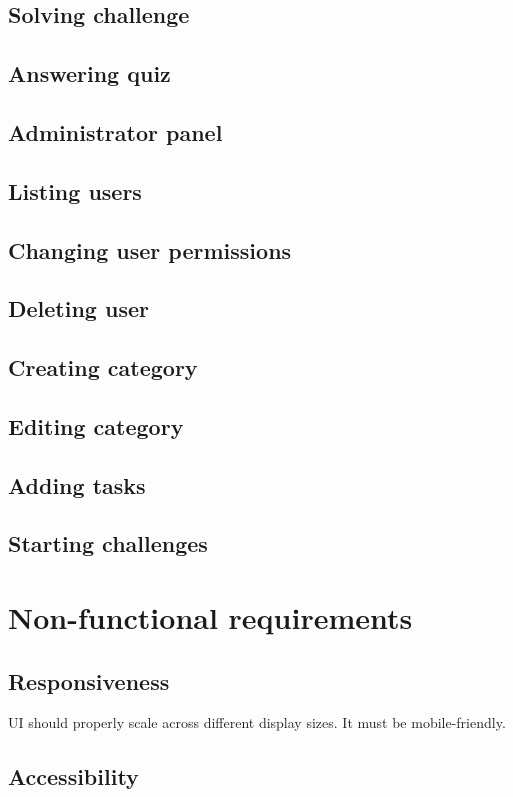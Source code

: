 \subsection{Solving challenge}
\subsection{Answering quiz}
\subsection{Administrator panel}
\subsection{Listing users}
\subsection{Changing user permissions}
\subsection{Deleting user}
\subsection{Creating category}
\subsection{Editing category}
\subsection{Adding tasks}
\subsection{Starting challenges}

\section{Non-functional requirements}

\subsection{Responsiveness}

UI should properly scale across different display sizes. It must be mobile-friendly.

\subsection{Accessibility}

